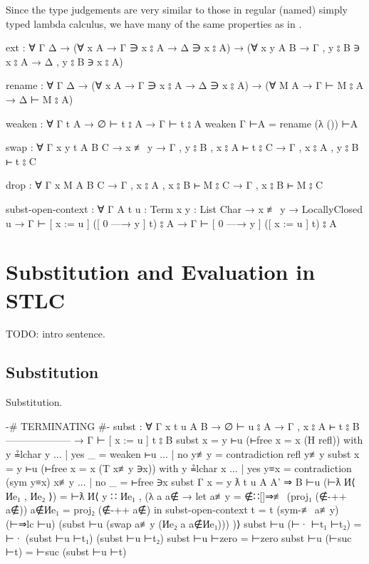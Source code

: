 \documentclass[logo,bsc,singlespacing,parskip,online]{infthesis}
\renewenvironment{code}{\mintedcopy[breaklines,breaksymbolleft=\;]{agda}}{\endmintedcopy}
\begin{document}
Since the type judgements are very similar to those in regular (named) simply typed lambda calculus,
we have many of the same properties as in \citet{wadler_programming_2022}.

\begin{code}
ext : ∀ {Γ Δ}
  → (∀ {x A}     →         Γ ∋ x ⦂ A →         Δ ∋ x ⦂ A)
  → (∀ {x y A B} → Γ , y ⦂ B ∋ x ⦂ A → Δ , y ⦂ B ∋ x ⦂ A)

rename : ∀ {Γ Δ}
  → (∀ {x A} → Γ ∋ x ⦂ A → Δ ∋ x ⦂ A)
  → (∀ {M A} → Γ ⊢ M ⦂ A → Δ ⊢ M ⦂ A)

weaken : ∀ {Γ t A}
  → ∅ ⊢ t ⦂ A
  → Γ ⊢ t ⦂ A
weaken {Γ} ⊢A = rename (λ ()) ⊢A

swap : ∀ {Γ x y t A B C}
  → x ≢ y
  → Γ , y ⦂ B , x ⦂ A ⊢ t ⦂ C
  → Γ , x ⦂ A , y ⦂ B ⊢ t ⦂ C

drop : ∀ {Γ x M A B C}
  → Γ , x ⦂ A , x ⦂ B ⊢ M ⦂ C
  → Γ , x ⦂ B ⊢ M ⦂ C

subst-open-context : ∀ {Γ A} {t u : Term} {x y : List Char}
  → x ≢ y
  → LocallyClosed u
  → Γ ⊢ [ x := u ] ([ 0 —→ y ] t) ⦂ A
  → Γ ⊢ [ 0 —→ y ] ([ x := u ] t) ⦂ A
\end{code}

\chapter{Substitution and Evaluation in STLC}
TODO: intro sentence.

\section{Substitution}
Substitution.

\begin{code}
{-# TERMINATING #-}
subst : ∀ {Γ x t u A B}
  → ∅ ⊢ u ⦂ A
  → Γ , x ⦂ A ⊢ t ⦂ B
    --------------------
  → Γ ⊢ [ x := u ] t ⦂ B
subst {x = y} ⊢u (⊢free {x = x} (H refl)) with y ≟lchar y
... | yes _   = weaken ⊢u
... | no  y≢y = contradiction refl y≢y
subst {x = y} ⊢u (⊢free {x = x} (T x≢y ∋x)) with y ≟lchar x
... | yes y≡x = contradiction (sym y≡x) x≢y
... | no  _   = ⊢free ∋x
subst {Γ} {x = y} {ƛ t} {u} {A} {A' ⇒ B} ⊢u (⊢ƛ И⟨ Иe₁ , Иe₂ ⟩) = ⊢ƛ
  И⟨ y ∷ Иe₁ , (λ a {a∉} →
    let a≢y   = ∉∷[]⇒≢ (proj₁ (∉-++ a∉))
        a∉Иe₁ = proj₂ (∉-++ a∉)
    in subst-open-context {t = t} (sym-≢ a≢y) (⊢⇒lc ⊢u) (subst ⊢u (swap a≢y (Иe₂ a {a∉Иe₁}))) )⟩
subst ⊢u (⊢· ⊢t₁ ⊢t₂) = ⊢· (subst ⊢u ⊢t₁) (subst ⊢u ⊢t₂)
subst ⊢u ⊢zero = ⊢zero
subst ⊢u (⊢suc ⊢t) = ⊢suc (subst ⊢u ⊢t)
\end{code}
\end{document}
